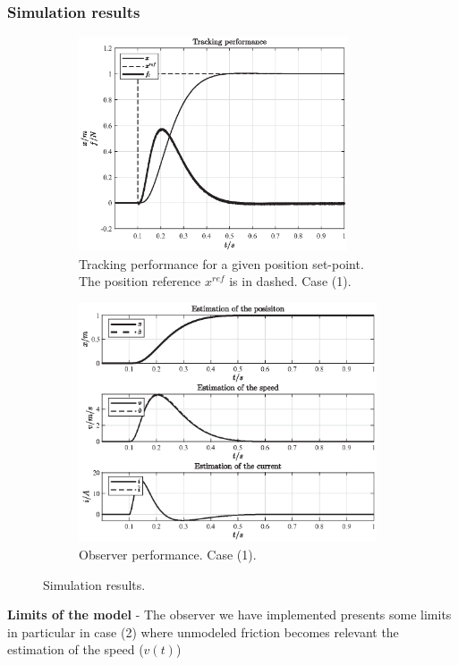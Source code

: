 \documentclass[11pt,a4paper,oneside]{book}
\numberwithin{equation}{section}
\theoremstyle{it}
\theoremstyle{definition}
\begin{document}
\subsubsection{Simulation results}
\begin{figure}[H]
	\centering
	\begin{subfigure}{.5\textwidth}
		\centering
		\includegraphics[width = 225pt, angle = 0, 
		keepaspectratio]{figures/moving_coil/track_x_1.eps}
		\captionsetup{width=0.75\textwidth}
		\caption{Tracking performance for a given position set-point. The 
			position reference $x^{ref}$ is in dashed. Case (1).}
		\label{figure_ctrl_coil_sim_results_1}
	\end{subfigure}%
	\begin{subfigure}{.5\textwidth}
		\centering
		\includegraphics[width = 250pt, angle = 0, 
		keepaspectratio]{figures/moving_coil/observer_1.eps}
		\captionsetup{width=0.75\textwidth}
		\caption{Observer performance. Case (1).}
		\label{figure_ctrl_coil_sim_results_2}
	\end{subfigure}
	\caption{Simulation results.}
	\label{}
\end{figure}
\textbf{Limits of the model} - 
The observer we have implemented presents some limits in particular in case (2) 
where unmodeled friction becomes relevant the estimation of the speed ($v(t)$) 
\end{document}
